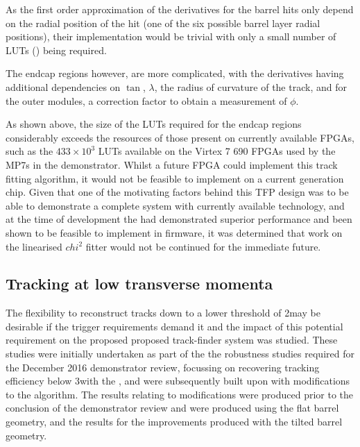As the first order approximation of the derivatives for the barrel hits only depend on the radial position of the hit (\ie one of the six possible barrel layer radial positions), their implementation would be trivial with only a small number of LUTs () being required.

The endcap regions however, are more complicated, with the derivatives having additional dependencies on $\tan$, $\lambda$, the radius of curvature of the track, and for the outer modules, a correction factor to obtain a measurement of $\phi$.



As shown above, the size of the LUTs required for the endcap regions considerably exceeds the resources of those present on currently available FPGAs, such as the $433 \times 10^{3}$ LUTs available on the Virtex 7 690 FPGAs used by the MP7s in the demonstrator.
Whilst a future FPGA could implement this track fitting algorithm, it would not be feasible to implement on a current generation chip.
Given that one of the motivating factors behind this TFP design was to be able to demonstrate a complete system with currently available technology, and at the time of development the \KF had demonstrated superior performance and been shown to be feasible to implement in firmware, it was determined that work on the linearised $chi^{2}$ fitter would not be continued for the immediate future.



\subsection{Tracking at low transverse momenta}\label{subsec:Tmtt2GeV}
The flexibility to reconstruct tracks down to a lower \pT threshold of 2\GeV may be desirable if the trigger requirements demand it and the impact of this potential requirement on the proposed proposed track-finder system was studied.
These studies were initially undertaken as part of the the robustness studies required for the December 2016 demonstrator review, focussing on recovering tracking efficiency below 3\GeV with the \HT, and were subsequently built upon with modifications to the \KF algorithm. 
The results relating to \HT modifications were produced prior to the conclusion of the demonstrator review and were produced using the flat barrel geometry, and the results for the \KF improvements produced with the tilted barrel geometry.


